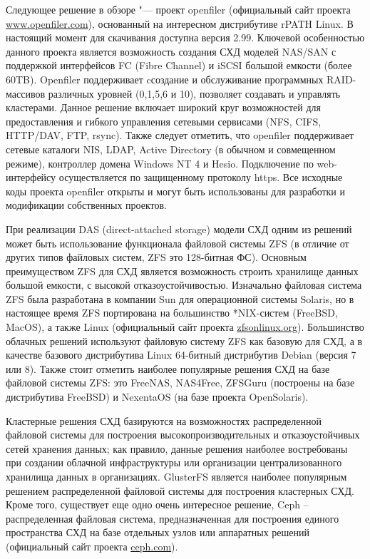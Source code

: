 \documentclass[10pt, a5paper]{article}
\begin{document}
Следующее решение в обзоре "--- проект openfiler (официальный сайт проекта \url{www.openfiler.com}), основанный на интересном дистрибутиве rPATH Linux. В настоящий момент для скачивания  доступна версия 2.99. Ключевой особенностью данного проекта является возможность создания СХД моделей NAS/SAN с поддержкой интерфейсов FC (Fibre Channel) и iSCSI большой емкости (более 60TB). Openfiler поддерживает cсоздание и обслуживание программных RAID-массивов различных уровней (0,1,5,6 и 10), позволяет создавать и управлять кластерами. Данное решение включает широкий круг возможностей для предоставления и гибкого управления сетевыми сервисами (NFS, CIFS, HTTP/DAV, FTP, rsync). Также следует отметить, что openfiler поддерживает сетевые каталоги  NIS, LDAP, Active Directory (в обычном и совмещенном режиме), контроллер домена Windows NT 4 и Hesio. Подключение по web-интерфейсу осуществляется по защищенному протоколу https. Все исходные коды проекта openfiler открыты и могут быть использованы для разработки и модификации собственных проектов.

При реализации DAS (direct-attached storage) модели СХД одним из решений может быть использование функционала файловой системы ZFS (в отличие от других типов файловых систем, ZFS это 128-битная ФС). Основным преимуществом ZFS для СХД является возможность строить хранилище данных большой емкости, с высокой отказоустойчивостью. Изначально файловая система ZFS была разработана в компании Sun для операционной системы Solaris, но  в настоящее время ZFS портирована на большинство *NIX-систем (FreeBSD, MacOS), а также  Linux (официальный сайт проекта \url{zfsonlinux.org}). Большинство облачных решений используют файловую систему ZFS как базовую для СХД, а в качестве базового дистрибутива Linux 64-битный дистрибутив Debian (версия 7 или 8). Также стоит отметить наиболее популярные решения СХД на базе файловой системы ZFS: это FreeNAS, NAS4Free, ZFSGuru (построены на базе дистрибутива FreeBSD) и NexentaOS (на базе проекта OpenSolaris).

Кластерные решения СХД базируются на возможностях распределенной файловой системы для построения высокопроизводительных и отказоустойчивых сетей хранения данных; как правило, данные решения наиболее востребованы при создании облачной инфраструктуры или организации централизованного хранилища данных в организациях. GlusterFS является наиболее популярным решением распределенной файловой системы для построения кластерных СХД. Кроме того, существует еще одно очень интересное решение, Ceph – распределенная файловая система, предназначенная для построения единого пространства СХД на базе отдельных узлов или аппаратных решений (официальный сайт проекта \url{ceph.com}).
\end{document}
